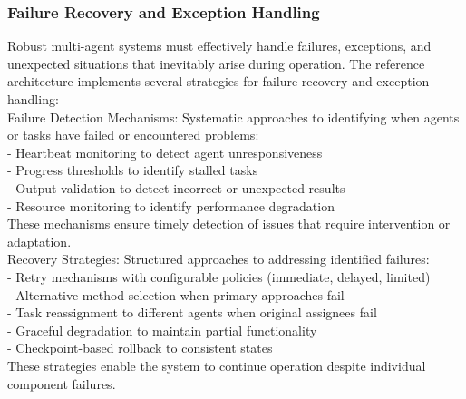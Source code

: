 \subsubsection{Failure Recovery and Exception Handling}
Robust multi-agent systems must effectively handle failures, exceptions, and unexpected situations that inevitably arise during operation. The reference architecture implements several strategies for failure recovery and exception handling:\\ \newline
Failure Detection Mechanisms: Systematic approaches to identifying when agents or tasks have failed or encountered problems:\\ \newline
- Heartbeat monitoring to detect agent unresponsiveness\\ \newline
- Progress thresholds to identify stalled tasks\\ \newline
- Output validation to detect incorrect or unexpected results\\ \newline
- Resource monitoring to identify performance degradation\\ \newline
These mechanisms ensure timely detection of issues that require intervention or adaptation.\\ \newline
Recovery Strategies: Structured approaches to addressing identified failures:\\ \newline
- Retry mechanisms with configurable policies (immediate, delayed, limited)\\ \newline
- Alternative method selection when primary approaches fail\\ \newline
- Task reassignment to different agents when original assignees fail\\ \newline
- Graceful degradation to maintain partial functionality\\ \newline
- Checkpoint-based rollback to consistent states\\ \newline
These strategies enable the system to continue operation despite individual component failures.\\ \newline
